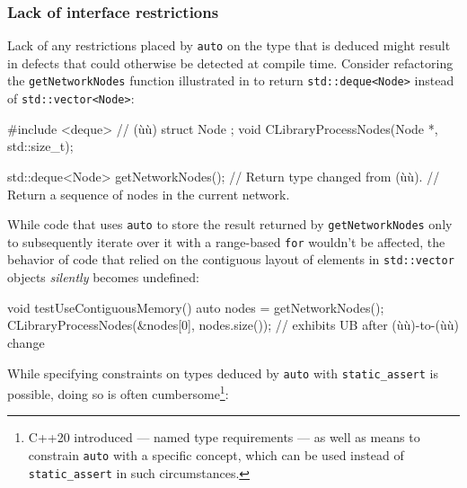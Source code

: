 \subsubsection[Lack of interface restrictions]{Lack of interface restrictions}\label{lack-of-interface-restrictions}

Lack of any restrictions placed by \lstinline!auto! on the type that is
deduced might result in defects that could otherwise be detected at
compile time. Consider refactoring the \lstinline!getNetworkNodes! function
illustrated in  to return \lstinline!std::deque<Node>! instead of
\lstinline!std::vector<Node>!:

\begin{emcppshiddenlisting}[emcppsbatch=e18]
#include <deque>     // (ù{}ù)
struct Node {};
void CLibraryProcessNodes(Node *, std::size_t);
\end{emcppshiddenlisting}
\begin{emcppslisting}[emcppsbatch=e18]
std::deque<Node> getNetworkNodes();  // Return type changed from (ù{}ù).
    // Return a sequence of nodes in the current network.
\end{emcppslisting}
    
\noindent While code that uses \lstinline!auto! to store the result returned by
\lstinline!getNetworkNodes! only to subsequently iterate over it with a
range-based \lstinline!for! wouldn't be affected, the behavior of code that
relied on the contiguous layout of elements in \lstinline!std::vector!
objects \emph{silently} becomes undefined:

\begin{emcppslisting}[emcppsbatch=e18]
void testUseContiguousMemory()
{
    auto nodes = getNetworkNodes();
    CLibraryProcessNodes(&nodes[0], nodes.size());  
        // exhibits UB after (ù{}ù)-to-(ù{}ù) change
}
\end{emcppslisting}
    
\noindent While specifying constraints on types deduced by
\lstinline!auto! with \lstinline!static_assert! is possible, doing so is often
cumbersome{\cprotect\footnote{C++20 introduced  ---
named type requirements --- as well as means to constrain
\lstinline!auto! with a specific concept, which can be used instead of
  \lstinline!static_assert! in such circumstances.}}:

